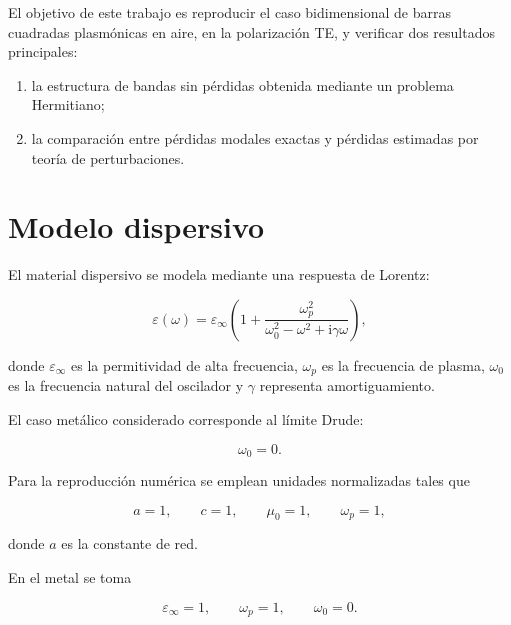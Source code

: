 \documentclass[11pt,a4paper]{article}
\newcommand{\ii}{\mathrm{i}}
\newcommand{\epsinf}{\varepsilon_\infty}
\newcommand{\omegap}{\omega_p}
\newcommand{\omegao}{\omega_0}
\begin{document}
El objetivo de este trabajo es reproducir el caso bidimensional de barras
cuadradas plasmónicas en aire, en la polarización TE, y verificar dos resultados
principales:

\begin{enumerate}
  \item la estructura de bandas sin pérdidas obtenida mediante un problema
        Hermitiano;
  \item la comparación entre pérdidas modales exactas y pérdidas estimadas por
        teoría de perturbaciones.
\end{enumerate}

\section{Modelo dispersivo}

El material dispersivo se modela mediante una respuesta de Lorentz:

\begin{equation}
  \varepsilon(\omega)
  =
  \epsinf
  \left(
    1 +
    \frac{\omegap^2}
    {
      \omegao^2 - \omega^2 + \ii\gamma\omega
    }
  \right),
  \label{eq:lorentz}
\end{equation}

donde $\epsinf$ es la permitividad de alta frecuencia, $\omegap$ es la
frecuencia de plasma, $\omegao$ es la frecuencia natural del oscilador y
$\gamma$ representa amortiguamiento.

El caso metálico considerado corresponde al límite Drude:

\begin{equation}
  \omegao = 0.
\end{equation}

Para la reproducción numérica se emplean unidades normalizadas tales que

\begin{equation}
  a = 1,
  \qquad
  c = 1,
  \qquad
  \mu_0 = 1,
  \qquad
  \omegap = 1,
\end{equation}

donde $a$ es la constante de red.

En el metal se toma

\begin{equation}
  \epsinf = 1,
  \qquad
  \omegap = 1,
  \qquad
  \omegao = 0.
\end{equation}
\end{document}

